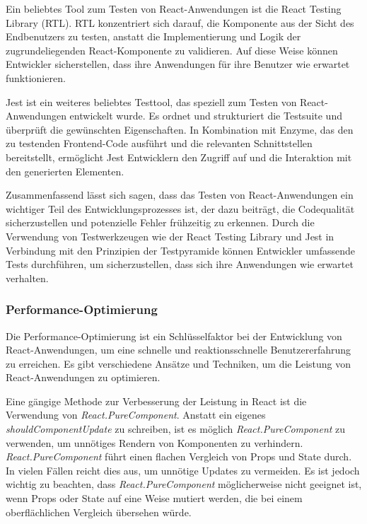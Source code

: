 Ein beliebtes Tool zum Testen von React-Anwendungen ist die React Testing Library (RTL). RTL konzentriert sich darauf, die Komponente aus der Sicht des Endbenutzers zu testen, anstatt die Implementierung und Logik der zugrundeliegenden React-Komponente zu validieren. Auf diese Weise können Entwickler sicherstellen, dass ihre Anwendungen für ihre Benutzer wie erwartet funktionieren. \cite{react-test-runebook}

Jest ist ein weiteres beliebtes Testtool, das speziell zum Testen von React-Anwendungen entwickelt wurde. Es ordnet und strukturiert die Testsuite und überprüft die gewünschten Eigenschaften. In Kombination mit Enzyme, das den zu testenden Frontend-Code ausführt und die relevanten Schnittstellen bereitstellt, ermöglicht Jest Entwicklern den Zugriff auf und die Interaktion mit den generierten Elementen. \cite{react-test-ix}

Zusammenfassend lässt sich sagen, dass das Testen von React-Anwendungen ein wichtiger Teil des Entwicklungsprozesses ist, der dazu beiträgt, die Codequalität sicherzustellen und potenzielle Fehler frühzeitig zu erkennen. Durch die Verwendung von Testwerkzeugen wie der React Testing Library und Jest in Verbindung mit den Prinzipien der Testpyramide können Entwickler umfassende Tests durchführen, um sicherzustellen, dass sich ihre Anwendungen wie erwartet verhalten.

\subsubsection{Performance-Optimierung}
Die Performance-Optimierung ist ein Schlüsselfaktor bei der Entwicklung von React-Anwendungen, um eine schnelle und reaktionsschnelle Benutzererfahrung zu erreichen. Es gibt verschiedene Ansätze und Techniken, um die Leistung von React-Anwendungen zu optimieren.

Eine gängige Methode zur Verbesserung der Leistung in React ist die Verwendung von \emph{React.PureComponent}. Anstatt ein eigenes \emph{shouldComponentUpdate} zu schreiben, ist es möglich \emph{React.PureComponent} zu verwenden, um unnötiges Rendern von Komponenten zu verhindern. \emph{React.PureComponent} führt einen flachen Vergleich von Props und State durch. In vielen Fällen reicht dies aus, um unnötige Updates zu vermeiden.
Es ist jedoch wichtig zu beachten, dass \emph{React.PureComponent} möglicherweise nicht geeignet ist, wenn Props oder State auf eine Weise mutiert werden, die bei einem oberflächlichen Vergleich übersehen würde.

